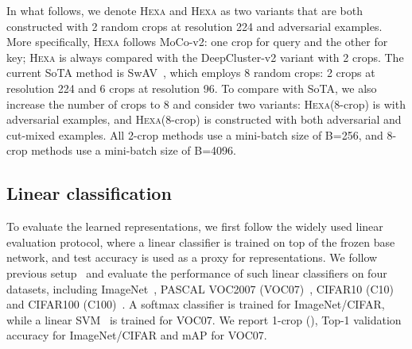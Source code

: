 \documentclass[10pt,twocolumn,letterpaper]{article}
\newcommand{\shortname}{\textsc{Hexa}}
\begin{document}
In what follows, we denote \shortname{} and \shortname{} as two variants that are both constructed with 2 random crops at resolution 224 and adversarial examples. 
More specifically, \shortname{} follows MoCo-v2: one crop for query and the other for key; \shortname{} is always compared with the DeepCluster-v2 variant with 2 crops. 
The current SoTA method is SwAV~\cite{caron2020unsupervised}, which employs 8 random crops: 2 crops at resolution 224 and 6 crops at resolution 96. To compare with SoTA,  we also increase the number of crops to 8 and consider two variants: \shortname{}(8-crop) is with adversarial examples, and \shortname{}(8-crop) is constructed with both adversarial and cut-mixed examples. 
All 2-crop methods use a mini-batch size of B=256, and 8-crop methods use a mini-batch size of B=4096.

\subsection{Linear classification}
To evaluate the learned representations, we first follow the widely used
linear evaluation protocol, where a linear classifier is trained on top of the frozen base network, and test accuracy is used as a proxy for representations. We follow previous setup~\cite{goyal2019scaling} and evaluate the performance of such linear classifiers on four datasets, including ImageNet~\cite{deng2009imagenet}, PASCAL VOC2007 (VOC07)~\cite{everingham2010pascal}, CIFAR10 (C10) and CIFAR100 (C100)~\cite{krizhevsky2009learning}.  A softmax classifier is trained for ImageNet/CIFAR, while a linear SVM~\cite{fan2008liblinear} is trained for VOC07. We report 1-crop (), Top-1 validation accuracy for ImageNet/CIFAR and mAP for VOC07.
\end{document}
